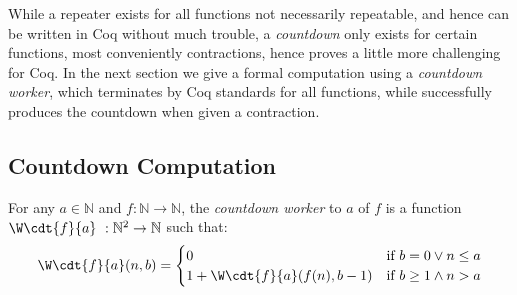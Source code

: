 While a repeater exists for all functions not necessarily repeatable, and hence can be written in Coq without much trouble, a \emph{countdown} only exists for certain functions, most conveniently contractions, hence proves a little more challenging for Coq. In the next section we give a formal computation using a \emph{countdown worker}, which terminates by Coq standards for all functions, while successfully produces the countdown when given a contraction.


\subsection{Countdown Computation}

\begin{defn} \label{defn: countdown-worker}
For any $a\in \mathbb{N}$ and $f: \mathbb{N}\to \mathbb{N}$, the \emph{countdown worker} to $a$ of $f$ is a function $\W\cdt{f}{a}\ : \mathbb{N}^2\to \mathbb{N}$ such that:
\begin{equation*}
\W\cdt{f}{a}(n, b) = \begin{cases}
0 & \text{if } b = 0 \vee n\le a \\ 1 +\W\cdt{f}{a}(f(n), b-1) & \text{if } b \ge 1 \wedge n > a
\end{cases}
\end{equation*}
\end{defn}

